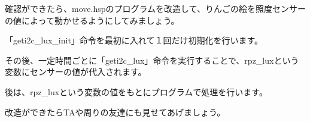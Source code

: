 確認ができたら、move.hspのプログラムを改造して、りんごの絵を照度センサーの値によって動かせるようにしてみましょう。


\begin{description}
    \item {}
\end{description}


「geti2c\_lux\_init」命令を最初に入れて１回だけ初期化を行います。

その後、一定時間ごとに「geti2c\_lux」命令を実行することで、rpz\_luxという変数にセンサーの値が代入されます。

後は、rpz\_luxという変数の値をもとにプログラムで処理を行います。

改造ができたらTAや周りの友達にも見せてあげましょう。

